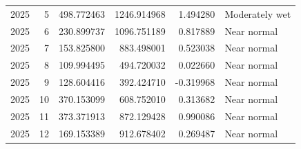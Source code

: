 \begin{tabular}{rrrrrl}
2025 & 5 & 498.772463 & 1246.914968 & 1.494280 & Moderately wet \\
2025 & 6 & 230.899737 & 1096.751189 & 0.817889 & Near normal \\
2025 & 7 & 153.825800 & 883.498001 & 0.523038 & Near normal \\
2025 & 8 & 109.994495 & 494.720032 & 0.022660 & Near normal \\
2025 & 9 & 128.604416 & 392.424710 & -0.319968 & Near normal \\
2025 & 10 & 370.153099 & 608.752010 & 0.313682 & Near normal \\
2025 & 11 & 373.371913 & 872.129428 & 0.990086 & Near normal \\
2025 & 12 & 169.153389 & 912.678402 & 0.269487 & Near normal \\
\bottomrule
\end{tabular}
